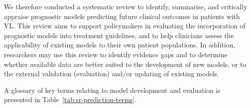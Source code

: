 We therefore conducted a systematic review to identify, summarise, and critically appraise prognostic models predicting future clinical outcomes in patients with VL. This review aims to support policymakers in evaluating the incorporation of prognostic models into treatment guidelines, and to help clinicians assess the applicability of existing models to their own patient populations. In addition, researchers may use this review to identify evidence gaps and to determine whether available data are better suited to the development of new models, or to the external validation (evaluation) and/or updating of existing models\cite{collinsExternalValidationMultivariable2014}.

A glossary of key terms relating to model development and evaluation is presented in Table~\ref{tab:sr-prediction-terms}.



